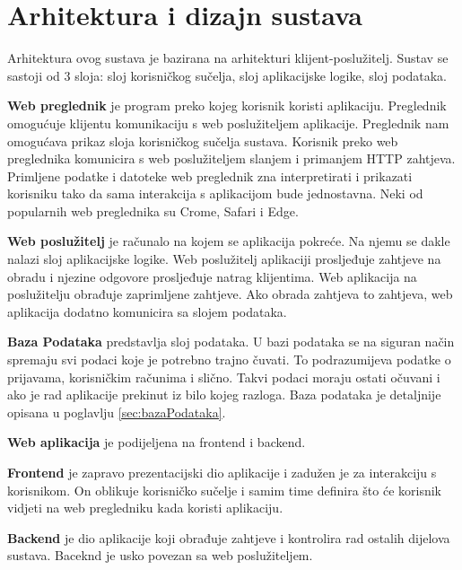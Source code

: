 \chapter{Arhitektura i dizajn sustava}
		
		Arhitektura ovog sustava je bazirana na arhitekturi klijent-poslužitelj. Sustav se sastoji od 3 sloja: sloj korisničkog sučelja, sloj aplikacijske logike, sloj podataka.
		
		\textbf{Web preglednik} je program preko kojeg korisnik koristi aplikaciju. Preglednik omogućuje klijentu komunikaciju s web poslužiteljem aplikacije. Preglednik nam omogućava prikaz sloja korisničkog sučelja sustava. Korisnik preko web preglednika komunicira s web poslužiteljem slanjem i primanjem HTTP zahtjeva. Primljene podatke i datoteke web preglednik zna interpretirati i prikazati korisniku tako da sama interakcija s aplikacijom bude jednostavna. Neki od popularnih web preglednika su Crome, Safari i Edge.
		
		\textbf{Web poslužitelj} je računalo na kojem se aplikacija pokreće. Na njemu se dakle nalazi sloj aplikacijske logike. Web poslužitelj aplikaciji prosljeđuje zahtjeve na obradu i njezine odgovore prosljeđuje natrag klijentima. Web aplikacija na poslužitelju obrađuje zaprimljene zahtjeve. Ako obrada zahtjeva to zahtjeva, web aplikacija dodatno komunicira sa slojem podataka.
		
		\textbf{Baza Podataka} predstavlja sloj podataka. U bazi podataka se na siguran način spremaju svi podaci koje je potrebno trajno čuvati. To podrazumijeva podatke o prijavama, korisničkim računima i slično. Takvi podaci moraju ostati očuvani i ako je rad aplikacije prekinut iz bilo kojeg razloga. Baza podataka je detaljnije opisana u poglavlju  \ref{sec:bazaPodataka}.
		
		\textbf{Web aplikacija} je podijeljena na frontend i backend.
		
		\textbf{Frontend} je zapravo prezentacijski dio aplikacije i zadužen je za interakciju s korisnikom. On oblikuje korisničko sučelje i samim time definira što će korisnik vidjeti na web pregledniku kada koristi aplikaciju.
		
		\textbf{Backend} je dio aplikacije koji obrađuje zahtjeve i kontrolira rad ostalih dijelova sustava. Baceknd je usko povezan sa web poslužiteljem.
		
